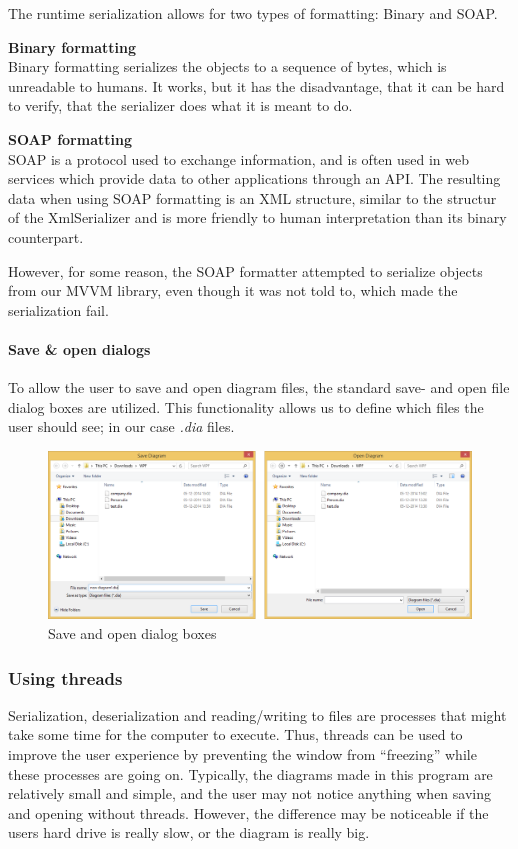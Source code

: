The runtime serialization allows for two types of formatting: Binary and SOAP.

\textbf{Binary formatting}\\
Binary formatting serializes the objects to a
sequence of bytes, which is unreadable to humans. It works, but it has the
disadvantage, that it can be hard to verify, that the serializer does what it is
meant to do.

\textbf{SOAP formatting}\\
SOAP is a protocol used to exchange information, and
is often used in web services which provide data to other applications through
an API. The resulting data when using SOAP formatting is an XML structure,
similar to the structur of the XmlSerializer and is more friendly to human
interpretation than its binary counterpart.

However, for some reason, the SOAP formatter attempted to serialize objects from
our MVVM library, even though it was not told to, which made the serialization
fail.

\paragraph{Save \& open dialogs}
To allow the user to save and open diagram files, the standard save- and open 
file dialog boxes are utilized. This functionality allows us to define which 
files the user should see; in our case \emph{.dia} files.

\begin{figure}[H]
	\centering
	\includegraphics[width=\linewidth]{img/save_open.png}
	\caption{Save and open dialog boxes \label{saveopen}}
\end{figure}

\subsubsection{Using threads}
Serialization, deserialization and reading/writing
to files are processes that might take some time for the computer to execute.
Thus, threads can be used to improve the user experience by preventing the
window from “freezing” while these processes are going on. Typically, the
diagrams made in this program are relatively small and simple, and the user may
not notice anything when saving and opening without threads. However, the
difference may be noticeable if the users hard drive is really slow, or the
diagram is really big.

